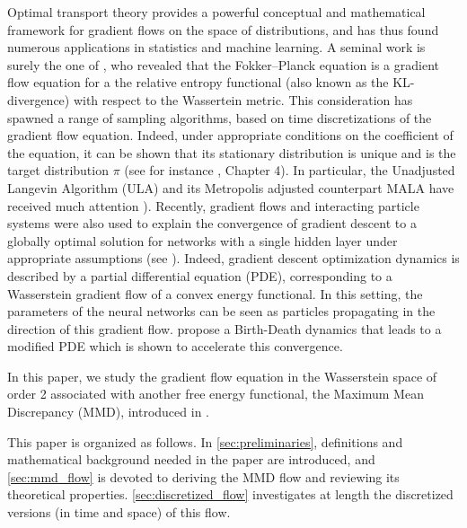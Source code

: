 Optimal transport theory provides a
powerful conceptual and mathematical framework for gradient flows on the space of distributions, and has thus found numerous applications in statistics and machine learning. A seminal work is surely the one of \cite{jordan1998variational}, who revealed that the Fokker–Planck equation is a gradient
flow equation for a the relative entropy functional (also known as the KL-divergence) with respect to the Wassertein metric. This consideration has spawned a range of sampling
algorithms, based on time discretizations of the gradient flow equation. Indeed, under appropriate conditions on the coefficient of the equation, it can be shown that its stationary distribution is unique and is the target distribution $\pi$ (see for instance \cite{pavliotis2011stochastic}, Chapter 4). In particular, the Unadjusted
Langevin Algorithm (ULA) and its Metropolis adjusted counterpart MALA have received much
attention \cite{durmus2018analysis,bernton2018langevin}). Recently, gradient flows and interacting particle systems were also used to explain the convergence of gradient descent to a globally optimal solution for networks with a single hidden layer under appropriate assumptions (see \cite{chizat2018global}). Indeed, gradient descent optimization dynamics is described by a partial differential equation (PDE), corresponding to a Wasserstein gradient flow of a convex energy functional. In this setting, the parameters of the neural networks can be seen as particles propagating in the direction of this gradient flow. \cite{rotskoff2019global} propose a Birth-Death dynamics that leads to a modified PDE which is shown to accelerate this convergence.


In this paper, we study the gradient flow equation in the Wasserstein space of order 2 associated with another free energy functional, the Maximum Mean Discrepancy (MMD), introduced in \cite{gretton2012kernel}. 

This paper is organized as follows. In \cref{sec:preliminaries}, definitions and mathematical background needed in the paper are introduced, and \cref{sec:mmd_flow} is devoted to deriving the MMD flow and reviewing its theoretical properties. 
\cref{sec:discretized_flow} investigates at length the discretized versions (in time and space) of this flow. 